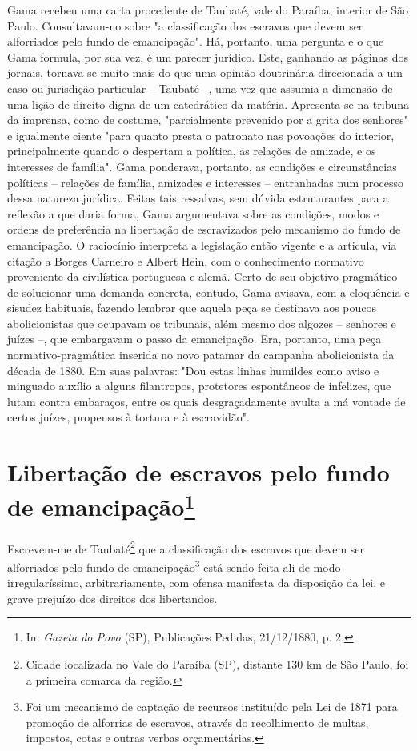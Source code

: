 {\small\noindent
Gama recebeu uma carta procedente de Taubaté, vale do Paraíba,
interior de São Paulo. Consultavam-no sobre "a classificação dos
escravos que devem ser alforriados pelo fundo de emancipação". Há,
portanto, uma pergunta e o que Gama formula, por sua vez, é um parecer
jurídico. Este, ganhando as páginas dos jornais, tornava-se muito mais
do que uma opinião doutrinária direcionada a um caso ou jurisdição
particular -- Taubaté --, uma vez que assumia a dimensão de uma lição de
direito digna de um catedrático da matéria. Apresenta-se na tribuna da
imprensa, como de costume, "parcialmente prevenido por a grita dos
senhores" e igualmente ciente "para quanto presta o patronato nas
povoações do interior, principalmente quando o despertam a política, as
relações de amizade, e os interesses de família". Gama ponderava,
portanto, as condições e circunstâncias políticas -- relações de
família, amizades e interesses -- entranhadas num processo dessa
natureza jurídica. Feitas tais ressalvas, sem dúvida estruturantes para
a reflexão a que daria forma, Gama argumentava sobre as condições, modos
e ordens de preferência na libertação de escravizados pelo mecanismo do
fundo de emancipação. O raciocínio interpreta a legislação então vigente
e a articula, via citação a Borges Carneiro e Albert Hein, com o
conhecimento normativo proveniente da civilística portuguesa e alemã.
Certo de seu objetivo pragmático de solucionar uma demanda concreta,
contudo, Gama avisava, com a eloquência e sisudez habituais, fazendo
lembrar que aquela peça se destinava aos poucos abolicionistas que
ocupavam os tribunais, além mesmo dos algozes -- senhores e juízes --,
que embargavam o passo da emancipação. Era, portanto, uma peça
normativo-pragmática inserida no novo patamar da campanha abolicionista
da década de 1880. Em suas palavras: "Dou estas linhas humildes como
aviso e minguado auxílio a alguns filantropos, protetores espontâneos de
infelizes, que lutam contra embaraços, entre os quais desgraçadamente
avulta a má vontade de certos juízes, propensos à tortura e à
escravidão".}

\chapter{Libertação de escravos pelo fundo de emancipação\footnote[*]{
  In: \emph{Gazeta do Povo} (SP), Publicações Pedidas, 21/12/1880, p. 2.}}

Escrevem-me de Taubaté\footnote{Cidade localizada no Vale do Paraíba
  (SP), distante 130 km de São Paulo, foi a primeira comarca da região.}
que a classificação dos escravos que devem ser alforriados pelo fundo de
emancipação\footnote{Foi um mecanismo de captação de recursos
  instituído pela Lei de 1871 para promoção de alforrias de escravos,
  através do recolhimento de multas, impostos, cotas e outras verbas
  orçamentárias.} está sendo feita ali de modo irregularíssimo,
arbitrariamente, com ofensa manifesta da disposição da lei, e grave
prejuízo dos direitos dos libertandos.

